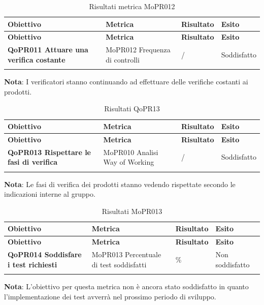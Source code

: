 \documentclass[../piano-di-qualifica.tex]{subfiles}
\begin{document}
\renewcommand{\arraystretch}{2} %
\begin{longtable}[H]{>{\centering\bfseries}m{5cm} >{\centering}m{5cm} >{\centering}m{2.5cm} >{\centering\arraybackslash}m{2.5cm}}  
  \rowcolor{lightgray}
  {\textbf{Obiettivo}} & {\textbf{Metrica}} & {\textbf{Risultato}} & {\textbf{Esito}}  \\
  \endfirsthead%
  \rowcolor{lightgray}
  {\textbf{Obiettivo}} & {\textbf{Metrica}} & {\textbf{Risultato}} & {\textbf{Esito}}  \\
  \endhead%
  \textbf{QoPR011 Attuare una verifica costante} & MoPR012 Frequenza di controlli & / & Soddisfatto \\
  \caption{Risultati metrica MoPR012}
  \label{tab:my-table}
\end{longtable}
\textbf{Nota}: I verificatori stanno continuando ad effettuare delle verifiche costanti ai prodotti.


\renewcommand{\arraystretch}{2} %
\begin{longtable}[H]{>{\centering\bfseries}m{5cm} >{\centering}m{5cm} >{\centering}m{2.5cm} >{\centering\arraybackslash}m{2.5cm}}  
  \rowcolor{lightgray}
  {\textbf{Obiettivo}} & {\textbf{Metrica}} & {\textbf{Risultato}} & {\textbf{Esito}}  \\
  \endfirsthead%
  \rowcolor{lightgray}
  {\textbf{Obiettivo}} & {\textbf{Metrica}} & {\textbf{Risultato}} & {\textbf{Esito}}  \\
  \endhead%
  \textbf{QoPR013 Rispettare le fasi di verifica} & MoPR010 Analisi Way of Working & / & Soddisfatto \\
  \caption{Risultati QoPR13}
  \label{tab:my-table}
\end{longtable}
\textbf{Nota}: Le fasi di verifica dei prodotti stanno vedendo rispettate secondo le indicazioni interne al gruppo.

\renewcommand{\arraystretch}{2} %
\begin{longtable}[H]{>{\centering\bfseries}m{5cm} >{\centering}m{5cm} >{\centering}m{2.5cm} >{\centering\arraybackslash}m{2.5cm}}  
  \rowcolor{lightgray}
  {\textbf{Obiettivo}} & {\textbf{Metrica}} & {\textbf{Risultato}} & {\textbf{Esito}}  \\
  \endfirsthead%
  \rowcolor{lightgray}
  {\textbf{Obiettivo}} & {\textbf{Metrica}} & {\textbf{Risultato}} & {\textbf{Esito}}  \\
  \endhead%
  \textbf{QoPR014 Soddisfare i test richiesti} & MoPR013 Percentuale di test soddisfatti & 0\% & Non soddisfatto \\
  \caption{Risultati MoPR013}
  \label{tab:my-table}
\end{longtable}
\textbf{Nota}: L'obiettivo per questa metrica non è ancora stato soddisfatto in quanto l'implementazione dei test avverrà nel prossimo periodo di sviluppo.
\end{document}
